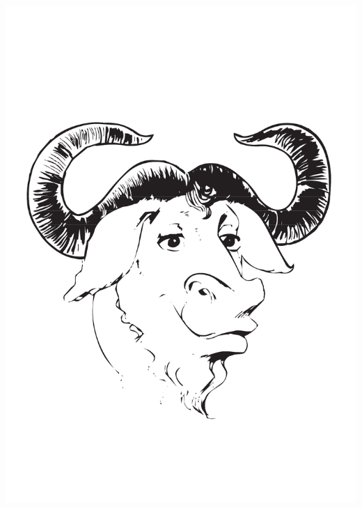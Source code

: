 \clearpage
\null\vfill
\begin{flushright}
 \includegraphics[scale=.4]{images/gnu-head}
\end{flushright}



